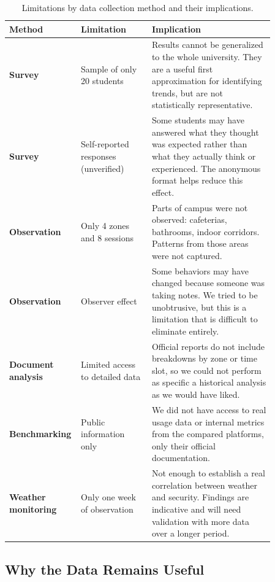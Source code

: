 \documentclass[12pt, onecolumn]{IEEEtran}
\begin{document}
\begin{table}[h]
\centering
\caption{Limitations by data collection method and their implications.}
\label{tab:limits}
\renewcommand{\arraystretch}{1.3}
\begin{tabular}{>{\bfseries\small}p{0.15\linewidth}
                >{\small}p{0.26\linewidth}
                >{\small}p{0.45\linewidth}}
\toprule
\textbf{Method} & \textbf{Limitation} & \textbf{Implication} \\
\midrule
Survey
  & Sample of only 20 students
  & Results cannot be generalized to the whole university. They are
    a useful first approximation for identifying trends, but are not
    statistically representative. \\
\rowcolor{rowgray}
Survey
  & Self-reported responses (unverified)
  & Some students may have answered what they thought was expected
    rather than what they actually think or experienced. The anonymous
    format helps reduce this effect. \\
Observation
  & Only 4 zones and 8 sessions
  & Parts of campus were not observed: cafeterias, bathrooms, indoor
    corridors. Patterns from those areas were not captured. \\
\rowcolor{rowgray}
Observation
  & Observer effect
  & Some behaviors may have changed because someone was taking notes.
    We tried to be unobtrusive, but this is a limitation that is
    difficult to eliminate entirely. \\
Document analysis
  & Limited access to detailed data
  & Official reports do not include breakdowns by zone or time slot,
    so we could not perform as specific a historical analysis as we
    would have liked. \\
\rowcolor{rowgray}
Benchmarking
  & Public information only
  & We did not have access to real usage data or internal metrics
    from the compared platforms, only their official documentation. \\
Weather monitoring
  & Only one week of observation
  & Not enough to establish a real correlation between weather and
    security. Findings are indicative and will need validation with
    more data over a longer period. \\
\bottomrule
\end{tabular}
\end{table}

\subsection{Why the Data Remains Useful}
\end{document}

